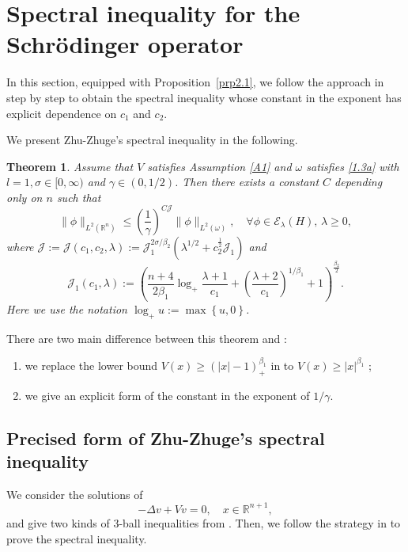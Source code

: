 \documentclass{article}
\numberwithin{equation}{section}
\newcommand\R{\ensuremath{\mathbb{R}}}
\newtheorem{theorem}{Theorem}[section]
\numberwithin{equation}{section}
\theoremstyle{definition}
\begin{document}
\section{Spectral inequality for the Schrödinger operator}\label{sec4d}
In this section, equipped with Proposition~\ref{prp2.1}, we follow the approach in \cite{zhu2023spectral} step by step to obtain the spectral inequality whose constant in the exponent has explicit dependence on $c_1$ and $c_2$.

We present Zhu-Zhuge's spectral inequality in the following.
\begin{theorem}\label{thm1.1}
	Assume that $V$ satisfies Assumption \ref{A1} and $\omega$ satisfies \eqref{1.3a} with $l=1,\sigma  \in [0,\infty)$ and $\gamma\in (0, 1 /2)$. Then there exists a constant $C$ depending only on $n$ such that
	\begin{equation}\label{1.11d}
		\|\phi\|_{L^2(\R^{n})}\le \left( \frac{1}{\gamma} \right) ^{C \mathcal{J}}\|\phi\|_{L^2(\omega)},\quad \forall\phi \in  \mathcal{E}_\lambda(H),\,\lambda\ge 0,
	\end{equation}
	where $\mathcal{J}:=\mathcal{J}(c_1,c_2,\lambda):=\mathcal{J}_1^{2\sigma /\beta_2}\left( \lambda^{1 /2}+c_2^{\frac{1}{2}}\mathcal{J}_1 \right) $ and 
	\begin{equation}
	\mathcal{J}_1(c_1,\lambda):= \left( \frac{n+4}{2\beta_1}\log_+ \frac{\lambda+1}{c_1}+\left( \frac{\lambda+2}{c_1} \right)^{1 / \beta_1} +1 \right)^{\frac{\beta_2}{2}}. 
	\end{equation}
	Here we use the notation $\log_+ u:=\max\left\{u,0\right\} $.
\end{theorem}
There are two main difference between this theorem and \cite[Theorem~1]{zhu2023spectral}:
\begin{enumerate}
	\item we replace the lower bound $V(x)\ge (|x|-1)_{+}^{\beta_1}$ in \cite{zhu2023spectral} to $V(x)\ge |x|^{\beta_1}$ ;
	\item we give an explicit form of the constant in the exponent of $1 /\gamma$.
\end{enumerate}
\subsection{Precised form of Zhu-Zhuge's spectral inequality}
We consider the solutions of 
\begin{equation}\label{3.1}
	-\Delta v+V v=0, \quad  x \in \R^{n+1},
\end{equation}
and give two kinds of $3$-ball inequalities from \cite{zhu2023spectral}. Then, we follow the strategy in \cite{dicke2022spectral,zhu2023spectral} to prove the spectral inequality.
\end{document}
